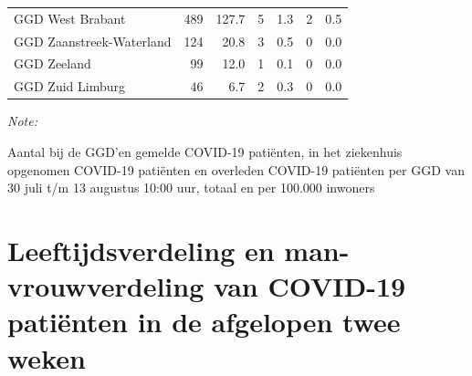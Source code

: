 \documentclass[
  english,
  man,floatsintext]{apa6}
\begin{document}
\begin{table}[H]
\begin{threeparttable}
\begin{tabular}{lrrrrrr}
GGD West Brabant & 489 & 127.7 & 5 & 1.3 & 2 & 0.5\\
GGD Zaanstreek-Waterland & 124 & 20.8 & 3 & 0.5 & 0 & 0.0\\
GGD Zeeland & 99 & 12.0 & 1 & 0.1 & 0 & 0.0\\
GGD Zuid Limburg & 46 & 6.7 & 2 & 0.3 & 0 & 0.0\\
\bottomrule
\end{tabular}
\begin{tablenotes}
\item \textit{Note: } 
\item Aantal bij de GGD’en gemelde COVID-19 patiënten, in het ziekenhuis opgenomen COVID-19 patiënten en overleden COVID-19 patiënten per GGD van 30 juli t/m 13 augustus 10:00 uur, totaal en per 100.000 inwoners
\end{tablenotes}
\end{threeparttable}
\endgroup{}
\end{table}

\newpage

\hypertarget{leeftijdsverdeling-en-man-vrouwverdeling-van-covid-19-patiuxebnten-in-de-afgelopen-twee-weken}{%
\section{Leeftijdsverdeling en man-vrouwverdeling van COVID-19 patiënten in de afgelopen twee weken}\label{leeftijdsverdeling-en-man-vrouwverdeling-van-covid-19-patiuxebnten-in-de-afgelopen-twee-weken}}
\end{document}
